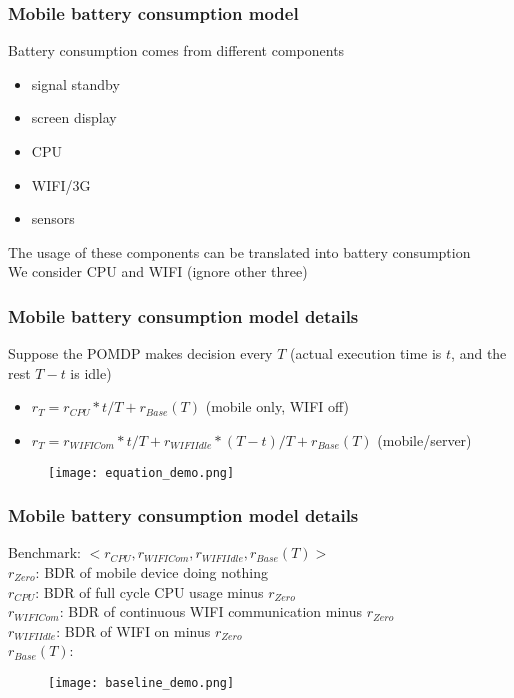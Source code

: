 \documentclass{beamer}
\begin{document}
\begin{frame}
\frametitle{Mobile battery consumption model}
Battery consumption comes from different components
\begin{itemize}
\item signal standby
\item screen display
\item CPU
\item WIFI/3G
\item sensors
\end{itemize}
\vspace{0.3cm}
\pause
The usage of these components can be translated into battery consumption\\
\vspace{0.3cm}
\pause
We consider CPU and WIFI (ignore other three)
\end{frame}

\begin{frame}
\frametitle{Mobile battery consumption model details}
Suppose the POMDP makes decision every $T$ (actual execution time is $t$, and the rest $T-t$ is idle)
\begin{itemize}
\item $r_T = r_{CPU}*t/T + r_{Base}(T)$ (mobile only, WIFI off)
\item $r_T = r_{WIFICom}*t/T + r_{WIFIIdle}*(T-t)/T + r_{Base}(T)$ (mobile/server)
\end{itemize}
\vspace{0.3cm}
\pause
\begin{figure}
\texttt{[image: equation\_demo.png]}
\end{figure}
\end{frame}

\begin{frame}
\frametitle{Mobile battery consumption model details}
Benchmark: $<r_{CPU},r_{WIFICom},r_{WIFIIdle},r_{Base}(T)>$\\
\vspace{0.2cm}
$r_{Zero}$: BDR of mobile device doing nothing\\
\vspace{0.2cm}
$r_{CPU}$: BDR of full cycle CPU usage minus $r_{Zero}$\\
\vspace{0.2cm}
$r_{WIFICom}$: BDR of continuous WIFI communication minus $r_{Zero}$\\
\vspace{0.2cm}
$r_{WIFIIdle}$: BDR of WIFI on minus $r_{Zero}$\\
\vspace{0.2cm}
$r_{Base}(T)$:
\begin{figure}
\texttt{[image: baseline\_demo.png]}
\end{figure}
\end{frame}
\end{document}
